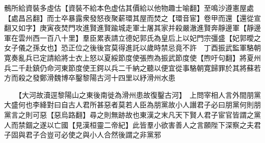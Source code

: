 鶻所給資裝多虛估【資裝不給本色虚估其價給以他物趣士喻翻】至鳴沙遵憲屋處【處昌呂翻】而士卒暴露衆發怒夜聚薪環其屋而焚之【環音宦】卷甲而還【還從宣翻又如字】庚寅夜焚門攻進賢進賢踰城走軍士屠其家并殺嚴澈進賢奔靜邊軍【靜邊軍在雲州西一百八十里】羣臣累表請立德妃郭氏為皇后上以妃門宗彊盛【妃郭曖之女子儀之孫女也】恐正位之後後宫莫得進託以歲時禁忌竟不許　丁酉振武監軍駱朝寛奏亂兵已定請給將士衣上怒以夏綏節度使張煦為振武節度使【煦吁句翻】將夏州兵二千赴鎮仍命河東節度使王鍔以兵二千納之聽以便宜從事駱朝寛歸罪於其將蘇若方而殺之發鄭滑魏博卒鑿黎陽古河十四里以紓滑州水患

　　【大河故瀆逕黎陽山之東後南徙為滑州患故復鑿古河】　上問宰相人言外間朋黨大盛何也李絳對曰自古人君所甚惡者莫若人臣為朋黨故小人譖君子必曰朋黨何則朋黨言之則可惡【惡烏路翻】尋之則無跡故也東漢之末凡天下賢人君子宦官皆謂之黨人而禁錮之遂以亡國【見漢桓靈二帝紀】此皆羣小欲害善人之言願陛下深察之夫君子固與君子合豈可必使之與小人合然後謂之非黨邪

